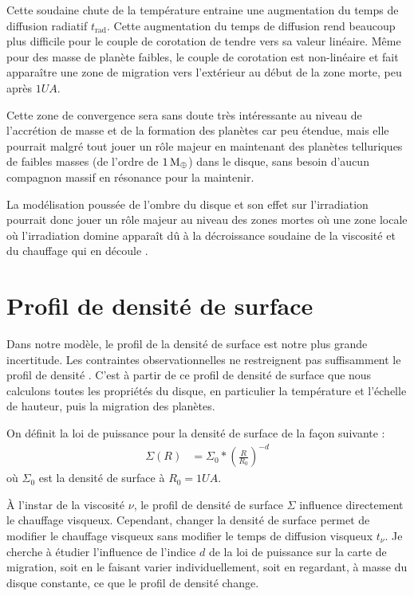 Cette soudaine chute de la température entraine une augmentation du temps de diffusion radiatif $t_\text{rad}$. Cette augmentation du temps de diffusion rend beaucoup plus difficile pour le couple de corotation de tendre vers sa valeur linéaire. Même pour des masse de planète faibles, le couple de corotation est non-linéaire et fait apparaître une zone de migration vers l'extérieur au début de la zone morte, peu après $1\unit{UA}$. 

Cette zone de convergence sera sans doute très intéressante au niveau de l'accrétion de masse et de la formation des
planètes car peu étendue, mais elle pourrait malgré tout jouer un rôle majeur en maintenant des planètes telluriques de faibles
masses (de l'ordre de $1\mathrm{\thinspace M_\oplus}$) dans le disque, sans besoin d'aucun compagnon massif en résonance pour la maintenir.

La modélisation poussée de l'ombre du disque et son effet sur l'irradiation pourrait donc jouer un rôle majeur au niveau des
zones mortes où une zone locale où l'irradiation domine apparaît dû à la décroissance soudaine de la viscosité et du chauffage
qui en découle \citep{matsumura2003origin}.

\section{Profil de densité de surface}
Dans notre modèle, le profil de la densité de surface est notre plus grande incertitude. Les contraintes observationnelles ne
restreignent pas suffisamment le profil de densité \citep[Fig. 12]{mundy2000structure, andrews2007high, williams2011protoplanetary,
guilloteau2011dual}. C'est à partir de ce profil de densité de surface que nous calculons toutes les propriétés du disque, en
particulier la température et l'échelle de hauteur, puis la migration des planètes. 

On définit la loi de puissance pour la densité de surface de la façon suivante : 
\begin{align}
\Sigma(R) &= \Sigma_0 * \left(\frac{R}{R_0}\right)^{-d}
\end{align}
où $\Sigma_0$ est la densité de surface à $R_0=1\unit{UA}$.

À l'instar de
la viscosité $\nu$, le profil de densité de surface $\Sigma$ influence directement le chauffage visqueux. Cependant, changer la
densité de surface permet de modifier le chauffage visqueux sans modifier le temps de diffusion visqueux $t_\nu$. Je cherche à
étudier l'influence de l'indice $d$ de la loi de puissance sur la carte de migration, soit en le faisant varier
individuellement, soit en regardant, à masse du disque constante, ce que le profil de densité change. 

